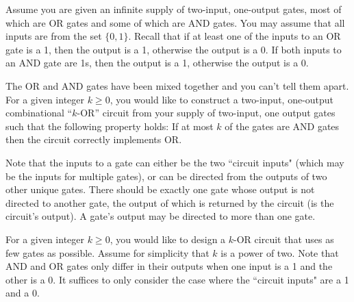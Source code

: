\documentclass[11pt]{article}
\theoremstyle{definition}
\theoremstyle{theorem}
\begin{document}
Assume you are given an infinite supply of two-input, one-output gates,
most of which are OR gates and some of which are AND gates. You may assume that all inputs are from the set $\{0, 1\}$. Recall that if at least one of the inputs to an OR gate is a 1, then the output is a 1, otherwise the output is a 0. If both inputs to an AND gate are 1s, then the output is a 1, otherwise the output is a 0.


The OR and AND gates have been mixed together and you
can't tell them apart.  For a given integer $k\geq 0$, you would like
to construct a two-input, one-output combinational ``$k$-OR'' circuit
from your supply of two-input, one output gates such that the following
property holds: If at most $k$ of the gates are AND gates then the
circuit correctly implements OR.   

Note that the inputs to a gate can either be the two ``circuit inputs" (which may be the inputs for multiple gates), or can be directed from the outputs of two other unique gates. There should be exactly one gate whose output is not directed to another gate, the output of which is returned by the circuit (is the circuit's output). A gate's output may be directed to more than one gate.

For a given integer $k \geq 0$, you would like to design a $k$-OR
circuit that uses as few gates as possible. Assume for simplicity that $k$ is a
power of two. Note that AND and OR gates only differ in their outputs when one input is a 1 and the other is a 0. It suffices to only consider the case where the ``circuit inputs" are a 1 and a 0.
\end{document}
